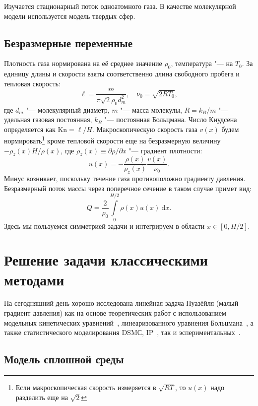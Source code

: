 \documentclass[english,russian,a4paper,12pt]{article}
\newcommand{\dd}{\:\mathrm{d}}
\newcommand{\Kn}{\mathrm{Kn}}
\begin{document}
Изучается стационарный поток одноатомного газа. В качестве молекулярной модели используется модель твердых сфер.

\subsection{Безразмерные переменные}

Плотность газа нормирована на её среднее значение \(\rho_0\), температура "--- на \(T_0\).
За единицу длины и скорости взяты соответственно длина свободного пробега и тепловая скорость:
\[ \ell = \frac{m}{\pi\sqrt2 \rho_0 d_m^2}, \quad \nu_0 = \sqrt{2RT_0}, \]
где \(d_m\) "--- молекулярный диаметр, \(m\) "--- масса молекулы, \(R = k_B/m\) "--- удельная газовая постоянная, \(k_B\) "--- постоянная Больцмана.
Число Кнудсена определяется как \(\Kn = \ell/H\).
Макроскопическую скорость газа \(v(x)\) будем нормировать\footnote 
{Если макроскопическая скорость измеряется в \(\sqrt{RT}\), то \(u(x)\) надо разделить еще на \(\sqrt{2}\)}
кроме тепловой скорости еще на безразмерную величину \(-\rho_z(x)H/\rho(x)\),
где \(\rho_z(x) \equiv \partial\rho/\partial x\) "--- градиент плотности:
\[ u(x) = -\frac{\rho(x)}{\rho_z(x)}\frac{v(x)}{\nu_0}. \]
Минус возникает, поскольку течение газа противоположно градиенту давления.
Безразмерный поток массы через поперечное сечение в таком случае примет вид:
\[ Q = \frac2{\rho_0 }\int\limits_{0}^{H/2}\rho(x)u(x) \dd x. \]
Здесь мы пользуемся симметрией задачи и интегрируем в области \(x\in[0,H/2]\).

\section{Решение задачи классическими методами}

На сегодняшний день хорошо исследована линейная задача Пуазёйля (малый градиент давления) как на основе
теоретических работ с использованием модельных кинетических уравнений~\cite{Cercignani1963, Cercignani1966, Sharipov1999},
линеаризованного уравнения Больцмана~\cite{Ohwada1989b}, а также статистического моделирования DSMС, IP~\cite{Fan2001},
так и эспериментальных~\cite{Porodnov1974, Ewart2007}.

\subsection{Модель сплошной среды}
\end{document}
